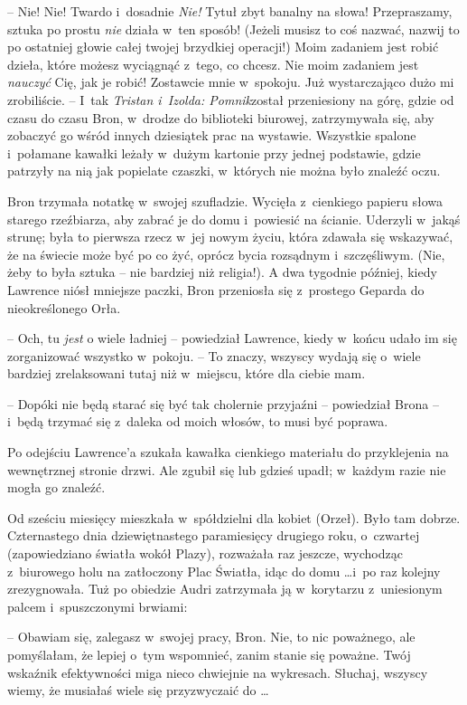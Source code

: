 \documentclass[oneside,polish,11pt,rmheadings]{mwbk}
\begin{document}
-- Nie! Nie! Twardo i~dosadnie \textit{Nie!} Tytuł zbyt banalny na słowa! Przepraszamy, sztuka po prostu \textit{nie }działa w~ten sposób! (Jeżeli musisz to coś nazwać, nazwij to po ostatniej głowie całej twojej brzydkiej operacji!) Moim zadaniem jest robić dzieła, które możesz wyciągnąć z~tego, co chcesz. Nie moim zadaniem jest \textit{nauczyć }Cię, jak je robić! Zostawcie mnie w~spokoju. Już wystarczająco dużo mi zrobiliście. -- I~tak \textit{Tristan i~Izolda: Pomnik}został przeniesiony na górę, gdzie od czasu do czasu Bron, w~drodze do biblioteki biurowej, zatrzymywała się, aby zobaczyć go wśród innych dziesiątek prac na wystawie. Wszystkie spalone i~połamane kawałki leżały w~dużym kartonie przy jednej podstawie, gdzie patrzyły na nią jak popielate czaszki, w~których nie można było znaleźć oczu. 

Bron trzymała notatkę w~swojej szufladzie. Wycięła z~cienkiego papieru słowa starego rzeźbiarza, aby zabrać je do domu i~powiesić na ścianie. Uderzyli w~jakąś strunę; była to pierwsza rzecz w~jej nowym życiu, która zdawała się wskazywać, że na świecie może być po co żyć, oprócz bycia rozsądnym i~szczęśliwym. (Nie, żeby to była sztuka -- nie bardziej niż religia!). A dwa tygodnie później, kiedy Lawrence niósł mniejsze paczki, Bron przeniosła się z~prostego Geparda do nieokreślonego Orła. 

-- Och, tu \textit{ jest }o wiele ładniej -- powiedział Lawrence, kiedy w~końcu udało im się zorganizować wszystko w~pokoju. -- To znaczy, wszyscy wydają się o~wiele bardziej zrelaksowani tutaj niż w~miejscu, które dla ciebie mam. 

-- Dopóki nie będą starać się być tak cholernie przyjaźni -- powiedział Brona --  i~będą trzymać się z~daleka od moich włosów, to musi być poprawa. 

Po odejściu Lawrence'a szukała kawałka cienkiego materiału do przyklejenia na wewnętrznej stronie drzwi. Ale zgubił się lub gdzieś upadł; w~każdym razie nie mogła go znaleźć. 

Od sześciu miesięcy mieszkała w~spółdzielni dla kobiet (Orzeł). Było tam dobrze. Czternastego dnia dziewiętnastego paramiesięcy drugiego roku, o~czwartej (zapowiedziano światła wokół Plazy), rozważała raz jeszcze, wychodząc z~biurowego holu na zatłoczony Plac Światła, idąc do domu \ldots  i~po raz kolejny zrezygnowała. Tuż po obiedzie Audri zatrzymała ją w~korytarzu z~uniesionym palcem i~spuszczonymi brwiami: 

-- Obawiam się, zalegasz w~swojej pracy, Bron. Nie, to nic poważnego, ale pomyślałam, że lepiej o~tym wspomnieć, zanim stanie się poważne. Twój wskaźnik efektywności miga nieco chwiejnie na wykresach. Słuchaj, wszyscy wiemy, że musiałaś wiele się przyzwyczaić do \ldots  
\end{document}
